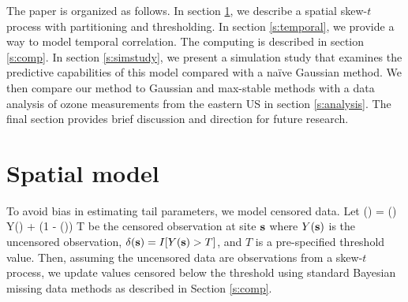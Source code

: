 \documentclass[11pt]{article}
\begin{document}
The paper is organized as follows.
In section \ref{s:spatial}, we describe a spatial skew-$t$ process with partitioning and thresholding.
In section \ref{s:temporal}, we provide a way to model temporal correlation.
The computing is described in section \ref{s:comp}.
In section \ref{s:simstudy}, we present a simulation study that examines the predictive capabilities of this model compared with a na{\"i}ve Gaussian method.
We then compare our method to Gaussian and max-stable methods with a data analysis of ozone measurements from the eastern US in section \ref{s:analysis}.
The final section provides brief discussion and direction for future research.

\section{Spatial model}\label{s:spatial}
To avoid bias in estimating tail parameters, we model censored data.
Let
\beq\label{Yt}
  (\bs) = \delta(\bs) Y(\bs) + (1 - \delta(\bs)) T
\eeq
be the censored observation at site $\mbox{\bf s}$ where $Y(\mbox{\bf s})$ is the uncensored observation, $\delta(\mbox{\bf s}) = I[Y(\mbox{\bf s}) > T]$, and $T$ is a pre-specified threshold value.
Then, assuming the uncensored data are observations from a skew-$t$ process, we update values censored below the threshold using standard Bayesian missing data methods as described in Section \ref{s:comp}.
\end{document}
